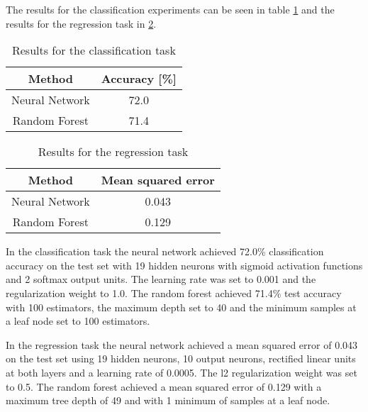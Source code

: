 
The results for the classification experiments can be seen in table \ref{tab:classification-results} and the results for the regression task in \ref{tab:regression-results}.

\begin{table}[H]
  \centering
  \begin{tabular*}{0.48\textwidth}{c|c}
    \textbf{Method} & \textbf{Accuracy [\%]} \\
    \midrule
    Neural Network & 72.0 \\
    Random Forest & 71.4 \\
  \end{tabular*}
  \label{tab:classification-results}
  \caption{Results for the classification task}
\end{table}

\begin{table}[H]
  \centering
  \begin{tabular*}{0.48\textwidth}{c|c}
    \textbf{Method} & \textbf{Mean squared error} \\
    \midrule
    Neural Network & 0.043 \\
    Random Forest & 0.129 \\
  \end{tabular*}
  \label{tab:regression-results}
  \caption{Results for the regression task}
\end{table}

In the classification task the neural network achieved 72.0\% classification accuracy on the test set with 19 hidden neurons with sigmoid activation functions and 2 softmax output units. The learning rate was set to 0.001 and the regularization weight to 1.0. The random forest achieved 71.4\% test accuracy with 100 estimators, the maximum depth set to 40 and the minimum samples at a leaf node set to 100 estimators.

In the regression task the neural network achieved a mean squared error of 0.043 on the test set using 19 hidden neurons, 10 output neurons, rectified linear units at both layers and a learning rate of 0.0005. The l2 regularization weight was set to 0.5. The random forest achieved a mean squared error of 0.129 with a maximum tree depth of 49 and with 1 minimum of samples at a leaf node.

